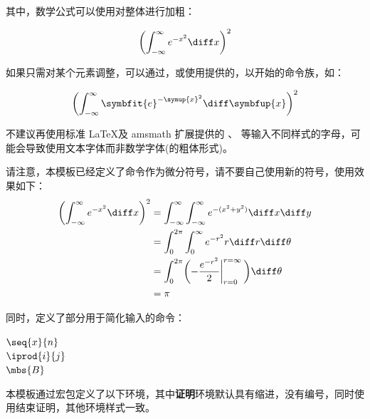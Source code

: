 其中，数学公式可以使用对整体进行加粗：

\begin{texcode}[]{}
\boldmath
\begin{equation}
  \biggl(\int_{-\infty}^\infty e^{-x^2}\diff x\biggr)^2 
\end{equation}
\unboldmath
\end{texcode}

如果只需对某个元素调整，可以通过\clist{\boldsymbol}，或使用提供的，以\clist{\sym}开始的命令族，如\clist{\symup, \symbfup, \symit, \symbfit}：
\begin{texcode}[]{}
  \begin{equation}
    \biggl(\int_{-\infty}^\infty \symbfit{e}^{-\symup{x}^2}\diff \symbfup{x}\biggr)^2 
  \end{equation}
\end{texcode}
不建议再使用标准 \LaTeX 及 amsmath 扩展提供的 \clist{\mathbf}、\clist{\mathcal} 等输入不同样式的字母，可能会导致使用文本字体而非数学字体(的粗体形式)。

请注意，本模板已经定义了\clist{\diff}命令作为微分符号，请不要自己使用新的符号，使用效果如下：
\begin{align}\label{equation:c1:diff}
  \biggl(\int_{-\infty}^\infty e^{-x^2}\diff x\biggr)^2 
    &= \int_{-\infty}^\infty\int_{-\infty}^\infty e^{-(x^2+y^2)}\diff x\diff y \\
    &= \int_0^{2\pi}\int_0^\infty e^{-r^2}r\diff r\diff\theta \\
    &= \int_0^{2\pi}\biggl(-\frac{e^{-r^2}}{2}\bigg\vert_{r=0}^{r=\infty}\,\biggr)\diff\theta \\
    &= \pi
\end{align}


同时，定义了部分用于简化输入的命令：

\begin{texcode}[sidebyside]{}
  $\seq{x}{n}$ \\ %
  $\iprod{i}{j}$ \\ %
  $\mbs{B}$  %
\end{texcode}

\label{section:Environments for math}

本模板通过宏包定义了以下环境，其中\textbf{证明}环境默认具有缩进，没有编号，同时使用\clist{\qedhere}结束证明，其他环境样式一致。

